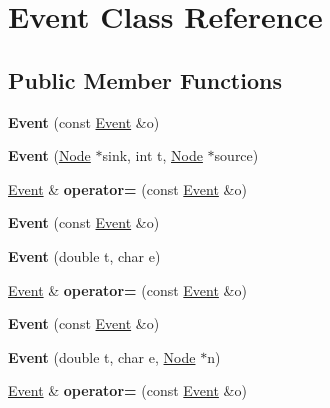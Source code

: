 \hypertarget{classEvent}{}\section{Event Class Reference}
\label{classEvent}
\subsection*{Public Member Functions}
\begin{DoxyCompactItemize}
\item 
\hypertarget{classEvent_abeb3fb64e44dec06fdb3e7278e0e045b}{}{\bfseries Event} (const \hyperlink{classEvent}{Event} \&o)\label{classEvent_abeb3fb64e44dec06fdb3e7278e0e045b}

\item 
\hypertarget{classEvent_a38585eb974c27a791695c2ae07680093}{}{\bfseries Event} (\hyperlink{classNode}{Node} $\ast$sink, int t, \hyperlink{classNode}{Node} $\ast$source)\label{classEvent_a38585eb974c27a791695c2ae07680093}

\item 
\hypertarget{classEvent_aba08af7e151431c376426ea6ad83ac76}{}\hyperlink{classEvent}{Event} \& {\bfseries operator=} (const \hyperlink{classEvent}{Event} \&o)\label{classEvent_aba08af7e151431c376426ea6ad83ac76}

\item 
\hypertarget{classEvent_abeb3fb64e44dec06fdb3e7278e0e045b}{}{\bfseries Event} (const \hyperlink{classEvent}{Event} \&o)\label{classEvent_abeb3fb64e44dec06fdb3e7278e0e045b}

\item 
\hypertarget{classEvent_aa1f26c73da20fa23029dbe6149220b29}{}{\bfseries Event} (double t, char e)\label{classEvent_aa1f26c73da20fa23029dbe6149220b29}

\item 
\hypertarget{classEvent_aba08af7e151431c376426ea6ad83ac76}{}\hyperlink{classEvent}{Event} \& {\bfseries operator=} (const \hyperlink{classEvent}{Event} \&o)\label{classEvent_aba08af7e151431c376426ea6ad83ac76}

\item 
\hypertarget{classEvent_abeb3fb64e44dec06fdb3e7278e0e045b}{}{\bfseries Event} (const \hyperlink{classEvent}{Event} \&o)\label{classEvent_abeb3fb64e44dec06fdb3e7278e0e045b}

\item 
\hypertarget{classEvent_a70b960ee98abf840b1d8016b60102d53}{}{\bfseries Event} (double t, char e, \hyperlink{classNode}{Node} $\ast$n)\label{classEvent_a70b960ee98abf840b1d8016b60102d53}

\item 
\hypertarget{classEvent_aba08af7e151431c376426ea6ad83ac76}{}\hyperlink{classEvent}{Event} \& {\bfseries operator=} (const \hyperlink{classEvent}{Event} \&o)\label{classEvent_aba08af7e151431c376426ea6ad83ac76}

\end{DoxyCompactItemize}
